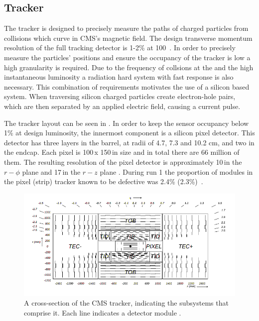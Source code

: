 \subsection{Tracker}
\label{sec:tracker}
The tracker is designed to precisely measure the paths of charged particles from \LHC collisions which curve in CMS's magnetic field. The design transverse momentum resolution of the full tracking detector is 1-2\% at 100\GeV~. In order to precisely measure the particles' positions and ensure the occupancy of the tracker is low a high granularity is required. Due to the frequency of collsions at the \LHC and the high instantaneous luminosity a radiation hard system with fast response is also necessary. This combination of requirements motivates the use of a silicon based system. When traversing silicon charged particles create electron-hole pairs, which are then separated by an applied electric field, causing a current pulse.

The tracker layout can be seen in . In order to keep the sensor occupancy below 1\% at design luminosity, the innermost component is a silicon pixel detector. This detector has three layers in the barrel, at radii of 4.7, 7.3 and 10.2 cm, and two in the endcap. Each pixel is 100\micron\,x 150\micron\,in size and in total there are 66 million of them. The resulting resolution of the pixel detector is approximately 10\micron\,in the $r-\phi$ plane and 17\micron\,in the $r-z$ plane \cite{trackerperformance}. During run 1 the proportion of modules in the pixel (strip) tracker known to be defective was 2.4\% (2.3\%)~\cite{Chatrchyan:1704291}.

\begin{figure}
  \includegraphics[width=1.2\largefigwidth]{plots/detector/TrackerSchematic.png}
  \caption{A cross-section of the CMS tracker, indicating the subsystems that comprise it. Each line indicates a detector module \cite{Chatrchyan:2008aa}.}
  \label{fig:trackerschematic}
\end{figure}



